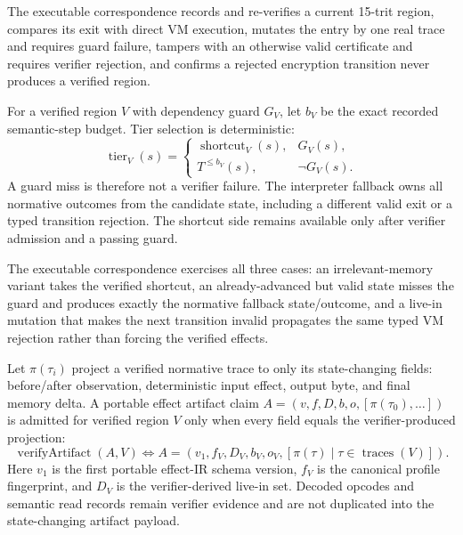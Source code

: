 \documentclass{article}
\begin{document}
The executable correspondence records and re-verifies a current 15-trit region,
compares its exit with direct VM execution, mutates the entry by one real trace
and requires guard failure, tampers with an otherwise valid certificate and
requires verifier rejection, and confirms a rejected encryption transition never
produces a verified region.

For a verified region $V$ with dependency guard $G_V$, let $b_V$ be the exact
recorded semantic-step budget. Tier selection is deterministic:
\begin{equation}
  \operatorname{tier}_V(s)=
  \begin{cases}
    \operatorname{shortcut}_V(s), & G_V(s),\\
    T^{\leq b_V}(s), & \neg G_V(s).
  \end{cases}
  \label{eq:state-graph-tiered-region-deopt}
\end{equation}
A guard miss is therefore not a verifier failure. The interpreter fallback owns
all normative outcomes from the candidate state, including a different valid
exit or a typed transition rejection. The shortcut side remains available only
after verifier admission and a passing guard.

The executable correspondence exercises all three cases: an irrelevant-memory
variant takes the verified shortcut, an already-advanced but valid state misses
the guard and produces exactly the normative fallback state/outcome, and a
live-in mutation that makes the next transition invalid propagates the same
typed
VM rejection rather than forcing the verified effects.

Let $\pi(\tau_i)$ project a verified normative trace to only its state-changing
fields: before/after observation, deterministic input effect, output byte, and
final memory delta. A portable effect artifact claim
$A=(v,f,D,b,o,[\pi(\tau_0),\ldots])$ is admitted for verified region $V$ only
when every field equals the verifier-produced projection:
\begin{equation}
  \operatorname{verifyArtifact}(A,V)
  \Longleftrightarrow
  A=\left(v_1,f_V,D_V,b_V,o_V,
    [\pi(\tau)\mid\tau\in\operatorname{traces}(V)]\right).
  \label{eq:state-graph-verified-effect-artifact}
\end{equation}
Here $v_1$ is the first portable effect-IR schema version, $f_V$ is the
canonical
profile fingerprint, and $D_V$ is the verifier-derived live-in set. Decoded
opcodes and semantic read records remain verifier evidence and are not
duplicated
into the state-changing artifact payload.
\end{document}
